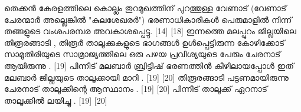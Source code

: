 \documentclass[a4paper,12pt,oneside,final]{article}
\begin{document}
തെക്കൻ കേരളത്തിലെ കൊല്ലം തുറമുഖത്തിന് പുറത്തുള്ള വേണാട് (വേണാട് ചേരന്മാർ അല്ലെങ്കിൽ "കുലശേഖരർ") ഭരണാധികാരികൾ പെരുമാളിൽ നിന്ന് തങ്ങളുടെ വംശപരമ്പര അവകാശപ്പെട്ടു. [14] [18] ഇന്നത്തെ മലപ്പുറം ജില്ലയിലെ തിരൂരങ്ങാടി , തിരൂർ താലൂക്കുകളുടെ ഭാഗങ്ങൾ ഉൾപ്പെട്ടിരുന്ന കോഴിക്കോട് സാമൂതിരിയുടെ സാമ്രാജ്യത്തിലെ ഒരു പഴയ പ്രവിശ്യയുടെ പേരും ചേരനാട് ആയിരുന്നു . [19] പിന്നീട് മലബാർ ബ്രിട്ടീഷ് ഭരണത്തിൻ കീഴിലായപ്പോൾ ഇത് മലബാർ ജില്ലയുടെ താലൂക്കായി മാറി . [19] [20] തിരൂരങ്ങാടി പട്ടണമായിരുന്നു ചേരനാട് താലൂക്കിന്റെ ആസ്ഥാനം . [19] [20] പിന്നീട് താലൂക്ക് ഏറനാട് താലൂക്കിൽ ലയിച്ചു . [19] [20]
\end{document}
